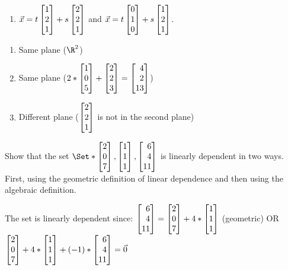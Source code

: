 \begin{exercises}
\begin{problist}
\begin{enumerate}
			\item $\vec x = t\mat{1\\2\\1}+ s\mat{2\\2\\1}$ and $\vec
				x = t\mat{0\\1\\0}+ s\mat{1\\2\\1}$.
		\end{enumerate}
		\begin{solution}
			\begin{enumerate}
				\item Same plane ($\R^2$)
				\item Same plane ($2*\mat{1\\0\\5} + \mat{2\\2\\3} = \mat{4\\2\\13}$)
				\item Different plane ($\mat{2\\2\\1}$ is not in the second plane)
			\end{enumerate}
		\end{solution}
		
		\prob Show that the set $\Set*{\mat{2\\0\\7},\mat{1\\1\\1},\mat{6\\4\\11}}$
		is linearly dependent in two ways. First, using the geometric definition of linear dependence
		and then using the algebraic definition.
		\begin{solution}
			The set is linearly dependent since: $\mat{6\\4\\11}=
			\mat{2\\0\\7}+ 4*\mat{1\\1\\1}$ (geometric) OR
			$\mat{2\\0\\7}+ 4*\mat{1\\1\\1}+ (-1)*\mat{6\\4\\11}=\vec{0}$
		\end{solution}
		

\end{problist}
\end{exercises}
